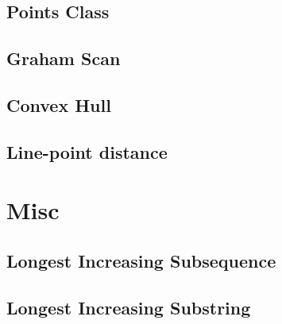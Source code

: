 \documentclass[a4paper]{article}
\begin{document}
\begin{multicols}{3}
\subsection{Points Class}


\subsection{Graham Scan}


\subsection{Convex Hull}


\subsection{Line-point distance}


\section{Misc}
\subsection{Longest Increasing Subsequence}


\subsection{Longest Increasing Substring}


\end{multicols}
\end{document}
